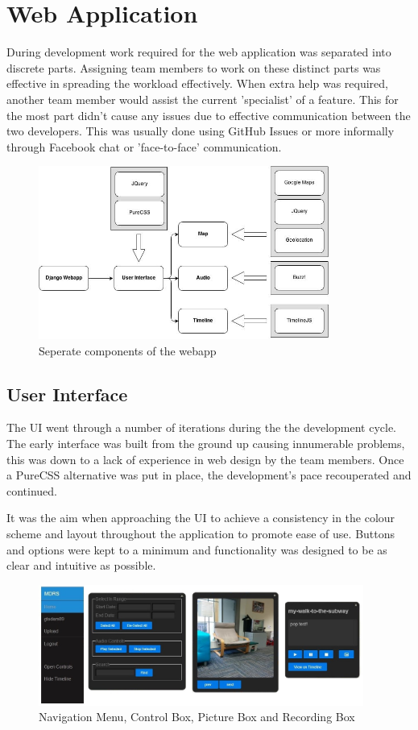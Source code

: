 \documentclass{l3proj}
\begin{document}
\section{Web Application}		During development work required for the web application was separated into discrete parts. Assigning team members to work on these distinct parts was effective in spreading the workload effectively. When extra help was required, another team member would assist the current 'specialist' of a feature. This for the most part didn't cause any issues due to effective communication between the two developers. This was usually done using GitHub Issues or more informally through Facebook chat or 'face-to-face' communication.

\begin{figure}[ht!]
\centering
\includegraphics[width=0.85\textwidth]{images/webapp-imp.jpg}
\caption{Seperate components of the webapp}
\end{figure}

\subsection{User Interface}		The UI went through a number of iterations during the the development cycle. The early interface was built from the ground up causing innumerable problems, this was down to a lack of experience in web design by the team members. Once a PureCSS alternative was put in place, the development's pace recouperated and continued.

It was the aim when approaching the UI to achieve a consistency in the colour scheme and layout throughout the application to promote ease of use. Buttons and options were kept to a minimum and functionality was designed to be as clear and intuitive as possible.

\begin{figure}[ht!]
\centering
\includegraphics[width=0.95\textwidth]{images/ui-elements.jpg}
\caption{Navigation Menu, Control Box, Picture Box and Recording Box}
\end{figure}
\end{document}

